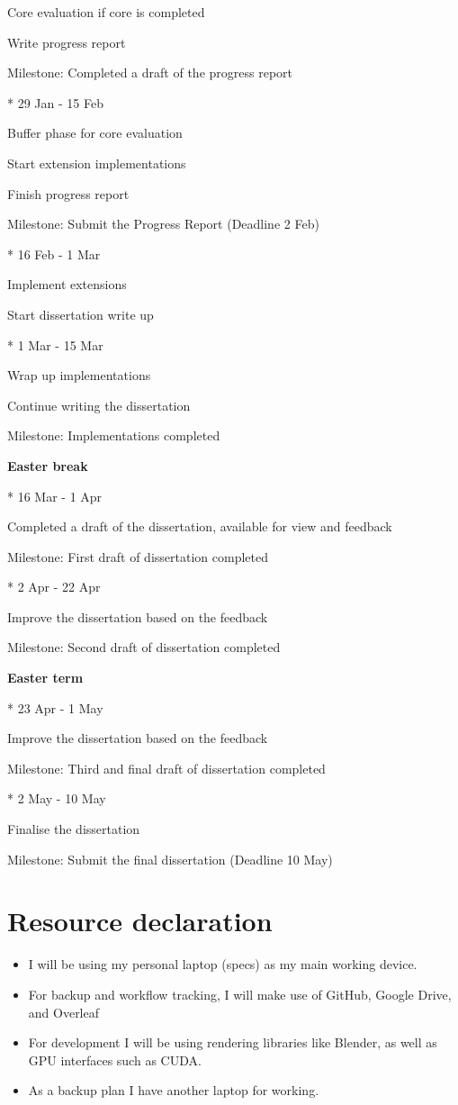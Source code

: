 \documentclass[12pt]{report}
\begin{document}
Core evaluation if core is completed

Write progress report

Milestone: Completed a draft of the progress report

* 29 Jan - 15 Feb

Buffer phase for core evaluation

Start extension implementations

Finish progress report

Milestone: Submit the Progress Report (Deadline 2 Feb)

* 16 Feb - 1 Mar

Implement extensions

Start dissertation write up

* 1 Mar - 15 Mar

Wrap up implementations

Continue writing the dissertation

Milestone: Implementations completed

\textbf{Easter break}

* 16 Mar - 1 Apr

Completed a draft of the dissertation, available for view and feedback

Milestone: First draft of dissertation completed

* 2 Apr - 22 Apr

Improve the dissertation based on the feedback

Milestone: Second draft of dissertation completed

\textbf{Easter term}

* 23 Apr - 1 May

Improve the dissertation based on the feedback

Milestone: Third and final draft of dissertation completed

* 2 May - 10 May

Finalise the dissertation

Milestone: Submit the final dissertation (Deadline 10 May)

\section{Resource declaration}

\begin{itemize}
\item I will be using my personal laptop (specs) as my main working device.
\item For backup and workflow tracking, I will make use of GitHub, Google Drive, and Overleaf
\item For development I will be using rendering libraries like Blender, as well as GPU interfaces such as CUDA.
\item As a backup plan I have another laptop for working.
\end{itemize}
\end{document}
